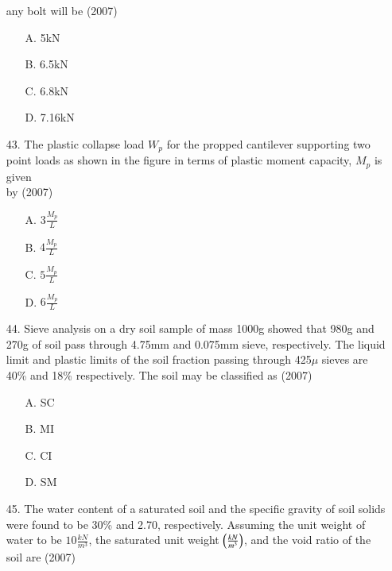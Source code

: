\documentclass[journal]{IEEEtran}
\begin{document}
\begin{enumerate}
  any bolt will be  \hfill (2007)
  \begin{figure}[!ht]
    \centering
    \caption{ }
    \label{4 }
  \end{figure}
  \begin{enumerate}
    \item [A.] 5kN
    \item [B.] 6.5kN
    \item [C.] 6.8kN
    \item [D.] 7.16kN
  \end{enumerate}
  \item [43.] The plastic collapse load $W_p$ for the propped cantilever supporting two point loads
  as shown in the figure in terms of plastic moment capacity, $M_p$ is given\\ by \hfill (2007)
  \begin{figure}[!ht]
    \centering
    \caption{ }
    \label{5 }
  \end{figure}
  \begin{enumerate}
    \item [A.] $3\frac{M_p}{L}$
    \item [B.] $4\frac{M_p}{L}$
    \item [C.] $5\frac{M_p}{L}$
    \item [D.] $6\frac{M_p}{L}$
  \end{enumerate}
  \item [44.] Sieve analysis on a dry soil sample of mass 1000g showed that 980g and 270g of
  soil pass through 4.75mm and 0.075mm sieve, respectively. The liquid limit and
  plastic limits of the soil fraction passing through 425$\mu$ sieves are 40\% and 18\%
  respectively. The soil may be classified as \hfill (2007)
  \begin{enumerate}
    \item [A.] SC
    \item [B.] MI
    \item [C.] CI
    \item [D.] SM
  \end{enumerate}
  \item[45.] The water content of a saturated soil and the specific gravity of soil solids were
  found to be 30\% and 2.70, respectively. Assuming the unit weight of water to be
  $10\frac{kN}{m^3}$, the saturated unit weight $\left(\frac{kN}{m^3}\right)$, and the void ratio of the soil are \hfill (2007)
  \begin{enumerate}

\end{enumerate}
\end{enumerate}
\end{document}

